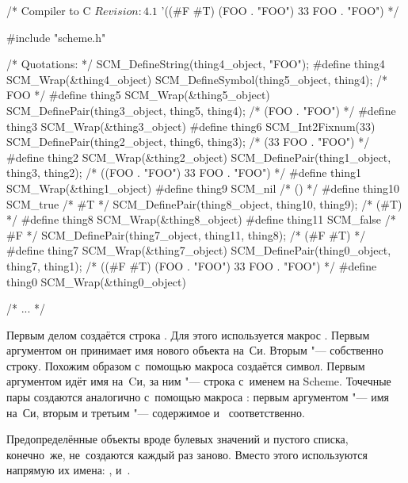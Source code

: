 \begin{code:c-frame}
/* Compiler to C $Revision: 4.1$
'((#F #T) (FOO . "FOO") 33 FOO . "FOO") */

#include "scheme.h"

/* Quotations: */
SCM_DefineString(thing4_object, "FOO");
#define thing4 SCM_Wrap(&thing4_object)
SCM_DefineSymbol(thing5_object, thing4);        /* FOO */
#define thing5 SCM_Wrap(&thing5_object)
SCM_DefinePair(thing3_object, thing5, thing4);  /* (FOO . "FOO") */
#define thing3 SCM_Wrap(&thing3_object)
#define thing6 SCM_Int2Fixnum(33)
SCM_DefinePair(thing2_object, thing6, thing3);  /* (33 FOO . "FOO") */
#define thing2 SCM_Wrap(&thing2_object)
SCM_DefinePair(thing1_object, thing3, thing2);
                                  /* ((FOO . "FOO") 33 FOO . "FOO") */
#define thing1 SCM_Wrap(&thing1_object)
#define thing9 SCM_nil                           /* ()  */
#define thing10 SCM_true                         /* \#T  */
SCM_DefinePair(thing8_object, thing10, thing9);  /* (#T) */
#define thing8 SCM_Wrap(&thing8_object)
#define thing11 SCM_false                        /* \#F */
SCM_DefinePair(thing7_object, thing11, thing8);  /* (#F #T) */
#define thing7 SCM_Wrap(&thing7_object)
SCM_DefinePair(thing0_object, thing7, thing1);
                          /* ((#F #T) (FOO . "FOO") 33 FOO . "FOO") */
#define thing0 SCM_Wrap(&thing0_object)

/* ... */
\end{code:c-frame}

Первым делом создаётся строка . Для этого используется макрос
. Первым аргументом он принимает имя нового объекта на~Си.
Вторым "--- собственно строку. Похожим образом с~помощью макроса
 создаётся символ. Первым аргументом идёт имя на~Cи, за
ним "--- строка с~именем на Scheme. Точечные пары создаются аналогично с~помощью
макроса : первым аргументом "--- имя на~Си, вторым и третьим
"--- содержимое  и~ соответственно.

Предопределённые объекты вроде булевых значений и пустого списка, конечно~же,
не~создаются каждый раз заново. Вместо этого используются напрямую их имена:
,  и~.

